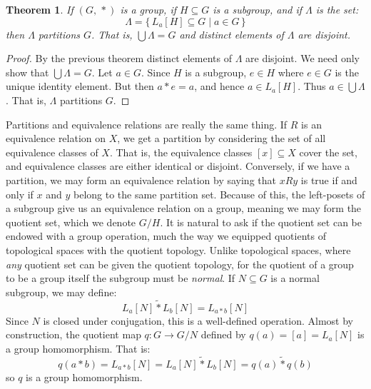 \documentclass{article}
\theoremstyle{plain}
\newtheorem{theorem}{Theorem}[section]
\theoremstyle{normal}
\begin{document}
            \begin{theorem}
                If $(G,\,*)$ is a group, if $H\subseteq{G}$ is a subgroup,
                and if $\Lambda$ is the set:
                \begin{equation}
                    \Lambda=\{\,L_{a}[H]\subseteq{G}\;|\;a\in{G}\,\}
                \end{equation}
                then $\Lambda$ partitions $G$. That is, $\bigcup\Lambda=G$ and
                distinct elements of $\Lambda$ are disjoint.
            \end{theorem}
            \begin{proof}
                By the previous theorem distinct elements of $\Lambda$ are
                disjoint. We need only show that $\bigcup\Lambda=G$. Let
                $a\in{G}$. Since $H$ is a subgroup, $e\in{H}$ where $e\in{G}$
                is the unique identity element. But then $a*e=a$, and hence
                $a\in{L}_{a}[H]$. Thus $a\in\bigcup\Lambda$. That is, $\Lambda$
                partitions $G$.
            \end{proof}
            Partitions and equivalence relations are really the same thing. If
            $R$ is an equivalence relation on $X$, we get a partition by
            considering the set of all equivalence classes of $X$. That is,
            the equivalence classes $[x]\subseteq{X}$ cover the set, and
            equivalence classes are either identical or disjoint. Conversely,
            if we have a partition, we may form an equivalence relation by
            saying that $xRy$ is true if and only if $x$ and $y$ belong to the
            same partition set. Because of this, the left-posets of a subgroup
            give us an equivalence relation on a group, meaning we may form the
            quotient set, which we denote $G/H$.
            It is natural to ask if the quotient set can be
            endowed with a group operation, much the way we equipped quotients
            of topological spaces with the quotient topology. Unlike
            topological spaces, where \textit{any} quotient set can be given
            the quotient topology, for the quotient of a group to be a group
            itself the subgroup must be \textit{normal}.
            If $N\subseteq{G}$ is a normal subgroup, we may define:
            \begin{equation}
                L_{a}[N]\tilde{*}L_{b}[N]=L_{a*b}[N]
            \end{equation}
            Since $N$ is closed under conjugation, this is a well-defined
            operation. Almost by construction, the quotient map
            $q:G\rightarrow{G}/N$ defined by
            $q(a)=[a]=L_{a}[N]$ is a group homomorphism. That is:
            \begin{equation}
                q(a*b)
                =L_{a*b}[N]
                =L_{a}[N]\tilde{*}L_{b}[N]
                =q(a)\tilde{*}q(b)
            \end{equation}
            so $q$ is a group homomorphism.
\end{document}
